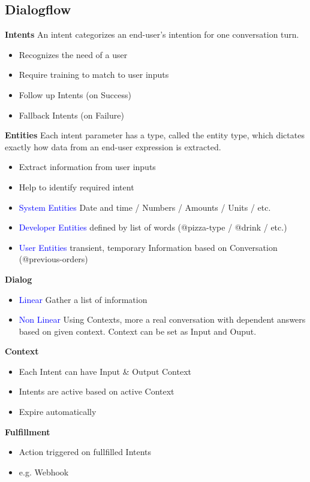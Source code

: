 \subsection{Dialogflow}
\textbf{Intents}
An intent categorizes an end-user's intention for one conversation turn.
\begin{itemize}
    \item Recognizes the need of a user
    \item Require training to match to user inputs
    \item Follow up Intents (on Success)
    \item Fallback Intents (on Failure)
\end{itemize}
\textbf{Entities}
Each intent parameter has a type, called the entity type, which dictates exactly how data from an end-user expression is extracted.
\begin{itemize}
    \item Extract information from user inputs
    \item Help to identify required intent
    \item \textcolor{blue}{System Entities} Date and time / Numbers / Amounts / Units / etc.
    \item \textcolor{blue}{Developer Entities} defined by list of words (@pizza-type / @drink / etc.)
    \item \textcolor{blue}{User Entities} transient, temporary Information based on Conversation (@previous-orders)
\end{itemize}
\textbf{Dialog}
\begin{itemize}
    \item \textcolor{blue}{Linear} Gather a list of information
    \item \textcolor{blue}{Non Linear} Using Contexts, more a real conversation with dependent answers based on given context. Context can be set as Input and Ouput.
\end{itemize}
\textbf{Context}
\begin{itemize}
    \item Each Intent can have Input \& Output Context
    \item Intents are active based on active Context
    \item Expire automatically
\end{itemize}
\textbf{Fulfillment}
\begin{itemize}
    \item Action triggered on fullfilled Intents
    \item e.g. Webhook
\end{itemize}

